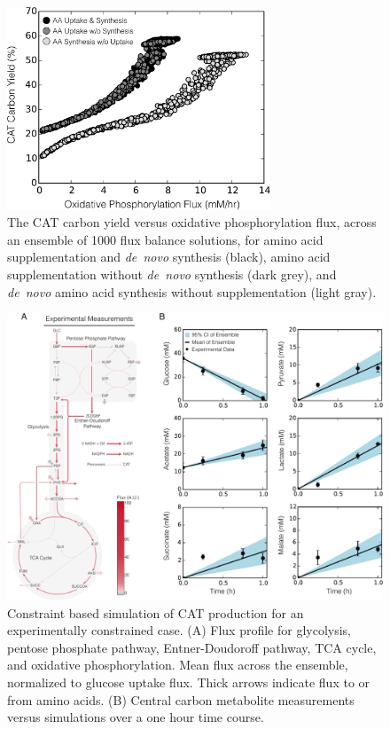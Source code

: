 \documentclass[journal=asbcd6,manuscript=article]{achemso}
\begin{document}
\clearpage

\begin{figure}[t!]
\includegraphics[width=0.7\textwidth]{./figs/Fig-4-OxyPhox-versus-Carbon-Yield.pdf}
\caption{The CAT carbon yield versus oxidative phosphorylation flux, across an ensemble of 1000 flux balance solutions,
for amino acid supplementation and \textit{de~novo} synthesis (black),
amino acid supplementation without \textit{de~novo} synthesis (dark grey),
and \textit{de~novo} amino acid synthesis without supplementation (light gray).}
\label{fig:oxphos_yield}
\end{figure}


\clearpage

\begin{figure}[t!]
\includegraphics[width=1.00\textwidth]{./figs/Fig-6-FluxDistribition-Experimental.pdf}
\caption{Constraint based simulation of CAT production for an experimentally constrained case.
(A) Flux profile for glycolysis, pentose phosphate pathway, Entner-Doudoroff pathway, TCA cycle, and oxidative phosphorylation.
Mean flux across the ensemble, normalized to glucose uptake flux. Thick arrows indicate flux to or from amino acids.
(B) Central carbon metabolite measurements versus simulations over a one hour time course.}
\label{fig:flux_exp}
\end{figure}
\end{document}
